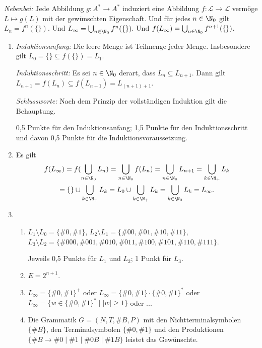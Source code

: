 \documentclass[12pt]{article}
\begin{document}
\begin{loesung}
  \emph{Nebenbei:} Jede Abbildung $g \colon A^* \to A^*$ induziert eine Abbildung $f \colon \mathcal{L} \to \mathcal{L}$ vermöge $L \mapsto g(L)$ mit der gewünschten Eigenschaft. Und für jedes $n \in \N_0$ gilt $L_n = f^n(\{\})$. Und $L_\infty = \bigcup_{n \in \N_0} f^n(\{\})$. Und $f(L_\infty) = \bigcup_{n \in \N_0} f^{n+1}(\{\})$.
  \begin{enumerate}
    \item \emph{Induktionsanfang:} Die leere Menge ist Teilmenge jeder Menge. Insbesondere gilt $L_0 = \{\} \subseteq f(\{\}) = L_1$.

          \emph{Induktionsschritt:} Es sei $n \in \N_0$ derart, dass $L_n \subseteq L_{n + 1}$. Dann gilt $L_{n + 1} = f(L_n) \subseteq f(L_{n + 1}) = L_{(n + 1) + 1}$.

          \emph{Schlussworte:} Nach dem Prinzip der vollständigen Induktion gilt die Behauptung.
          \begin{korrektur}
            0,5 Punkte für den Induktionsanfang; 1,5 Punkte für den Induktionsschritt und davon 0,5 Punkte für die Induktionsvoraussetzung.
          \end{korrektur}
    \item Es gilt
          \begin{multline*}
            f(L_\infty) = f(\bigcup_{n \in \N_0} L_n)
                        = \bigcup_{n \in \N_0} f(L_n)
                        = \bigcup_{n \in \N_0} L_{n + 1}
                        = \bigcup_{k \in \N_+} L_k\\
                        = \{\} \cup \bigcup_{k \in \N_+} L_k
                        = L_0 \cup \bigcup_{k \in \N_+} L_k
                        = \bigcup_{k \in \N_0} L_k
                        = L_\infty.
          \end{multline*}
    \item \begin{enumerate}
            \item $L_1 \setminus L_0 = \{\#0,\#1\}$, $L_2 \setminus L_1 = \{\#{00},\#{01},\#{10},\#{11}\}$, $L_3 \setminus L_2 = \{\#{000},\#{001},\#{010},\#{011},\#{100},\#{101},\#{110},\#{111}\}$.
                  \begin{korrektur}
                    Jeweils 0,5 Punkte für $L_1$ und $L_2$; 1 Punkt für $L_3$.
                  \end{korrektur}
            \item $E = 2^{n + 1}$.
            \item $L_\infty = \{\#0,\#1\}^+$ oder $L_\infty = \{\#0,\#1\} \cdot \{\#0,\#1\}^*$ oder $L_\infty = \{w \in \{\#0,\#1\}^* \mid |w| \geq 1\}$ oder ...
            \item Die Grammatik $G = (N, T, \#B, P)$ mit den Nichtterminalsymbolen $\{ \#B \}$, den Terminalsymbolen $\{ \#0, \#1 \}$ und den Produktionen $\{ \#B \rightarrow \#0 \mid \#1 \mid \#{0B} \mid \#{1B} \}$ leistet das Gewünschte.


\end{enumerate}
\end{enumerate}
\end{loesung}
\end{document}
